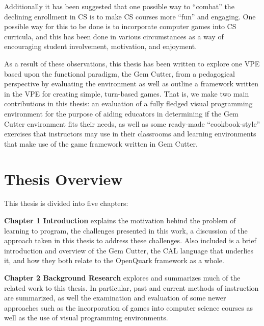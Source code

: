 Additionally it has been suggested that one possible way to ``combat'' the declining enrollment in CS is to make CS courses more ``fun'' and engaging\cite{Carter06}.  One possible way for this to be done is to incorporate computer games into CS curricula, and this has been done in various circumstances as a way of encouraging student involvement, motivation, and enjoyment\cite{Barnes08,Gooch08,Curtis05,Overmars05,Sweedyk05}.

As a result of these observations, this thesis has been written to explore one VPE based upon the functional paradigm, the Gem Cutter, from a pedagogical perspective by evaluating the environment as well as outline a framework written in the VPE for creating simple, turn-based games.  That is, we make two main contributions in this thesis: an evaluation of a fully fledged visual programming environment for the purpose of aiding educators in determining if the Gem Cutter environment fits their needs, as well as some ready-made ``cookbook-style'' exercises that instructors may use in their classrooms and learning environments that make use of the game framework written in Gem Cutter.

\section{Thesis Overview}

This thesis is divided into five chapters:


\textbf{Chapter 1 Introduction} explains the motivation behind the problem of learning to program, the challenges presented in this work, a discussion of the approach taken in this thesis to address these challenges.  Also included is a brief introduction and overview of the Gem Cutter, the CAL language that underlies it, and how they both relate to the OpenQuark framework as a whole.


\textbf{Chapter 2 Background Research} explores and summarizes much of the related work to this thesis.  In particular, past and current methods of instruction are summarized, as well the examination and evaluation of some newer approaches such as the incorporation of games into computer science courses as well as the use of visual programming environments.

